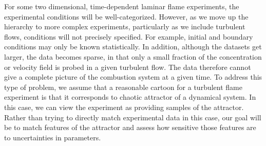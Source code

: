 \documentclass[11pt]{article}
\begin{document}
For some two dimensional, time-dependent laminar flame experiments, the
experimental conditions will be well-categorized. However,
as we move up the hierarchy to more complex experiments, particularly
as we include turbulent flows, conditions will not precisely specified.
For example, initial and boundary conditions may only be known statistically.
In addition, although the datasets
get larger, the data becomes sparse, in that only a small fraction
of the concentration or velocity field is probed in a given turbulent
flow.
The data therefore cannot give a complete picture of the
combustion system at a given time.
To address this type of problem, we assume that
a reasonable cartoon for a turbulent flame experiment is that it
corresponds to chaotic attractor of a dynamical system.
In this case, we can view the experiment as 
providing samples of the attractor. 
Rather than trying to directly match experimental data in this case, our goal
will be to match features of the attractor and assess how sensitive
those features are to uncertainties in parameters.

\end{document}
